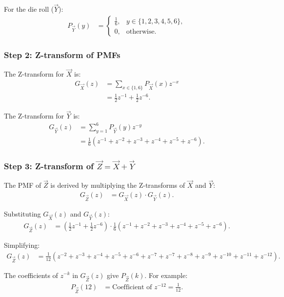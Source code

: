 \documentclass[journal]{IEEEtran}
\begin{document}
For the die roll ($\vec{Y}$):
\begin{align}
P_{\vec{Y}}(y) &= 
\begin{cases} 
\frac{1}{6}, & y \in \{1, 2, 3, 4, 5, 6\}, \\
0, & \text{otherwise}.
\end{cases}
\end{align}

\subsubsection*{Step 2: Z-transform of PMFs}
The Z-transform for $\vec{X}$ is:
\begin{align}
G_{\vec{X}}(z) &= \sum_{x \in \{1, 6\}} P_{\vec{X}}(x) z^{-x} \\
     &= \frac{1}{2} z^{-1} + \frac{1}{2} z^{-6}.
\end{align}

The Z-transform for $\vec{Y}$ is:
\begin{align}
G_{\vec{Y}}(z) &= \sum_{y=1}^{6} P_{\vec{Y}}(y) z^{-y} \\
     &= \frac{1}{6} (z^{-1} + z^{-2} + z^{-3} + z^{-4} + z^{-5} + z^{-6}).
\end{align}

\subsubsection*{Step 3: Z-transform of $\vec{Z} = \vec{X} + \vec{Y}$}
The PMF of $\vec{Z}$ is derived by multiplying the Z-transforms of $\vec{X}$ and $\vec{Y}$:
\begin{align}
G_{\vec{Z}}(z) &= G_{\vec{X}}(z) \cdot G_{\vec{Y}}(z).
\end{align}

Substituting $G_{\vec{X}}(z)$ and $G_{\vec{Y}}(z)$:
\begin{align}
G_{\vec{Z}}(z) &= \left(\frac{1}{2} z^{-1} + \frac{1}{2} z^{-6}\right) \cdot \frac{1}{6} (z^{-1} + z^{-2} + z^{-3} + z^{-4} + z^{-5} + z^{-6}).
\end{align}

Simplifying:
\begin{align}
G_{\vec{Z}}(z) &= \frac{1}{12} \left(z^{-2} + z^{-3} + z^{-4} + z^{-5} + z^{-6} + z^{-7} + z^{-7} + z^{-8} + z^{-9} + z^{-10} + z^{-11} + z^{-12}\right).
\end{align}

The coefficients of $z^{-k}$ in $G_{\vec{Z}}(z)$ give $P_{\vec{Z}}(k)$. For example:
\begin{align}
P_{\vec{Z}}(12) &= \text{Coefficient of } z^{-12} = \frac{1}{12}.
\end{align}
\end{document}
